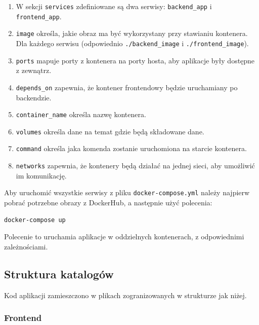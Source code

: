 \begin{enumerate}
    \item W sekcji \texttt{services} zdefiniowane są dwa serwisy: \texttt{backend\_app} i \texttt{frontend\_app}.
    \item \texttt{image} określa, jakie obraz ma być wykorzystany przy stawianiu kontenera. Dla każdego serwisu (odpowiednio \texttt{./backend\_image} i \texttt{./frontend\_image}).
    \item \texttt{ports} mapuje porty z kontenera na porty hosta, aby aplikacje były dostępne z zewnątrz.
    \item \texttt{depends\_on} zapewnia, że kontener frontendowy będzie uruchamiany po backendzie.
		\item \texttt{container\_name} określa nazwę kontenera.
		\item \texttt{volumes} określa dane na temat gdzie będą składowane dane.
		\item \texttt{command} określa jaka komenda zostanie uruchomiona na starcie kontenera.
		\item \texttt{networks} zapewnia, że kontenery będą działać na jednej sieci, aby umożliwić im komunikację.
\end{enumerate}

Aby uruchomić wszystkie serwisy z pliku \texttt{docker-compose.yml} należy najpierw pobrać potrzebne obrazy z DockerHub, a następnie użyć polecenia:
\begin{lstlisting}[basicstyle=\footnotesize\ttfamily]
docker-compose up
\end{lstlisting}

Polecenie to uruchamia aplikacje w oddzielnych kontenerach, z odpowiednimi zależnościami.

\subsection{Struktura katalogów}
Kod aplikacji zamieszczono w plikach zogranizowanych w strukturze jak niżej.
\subsubsection{Frontend}
